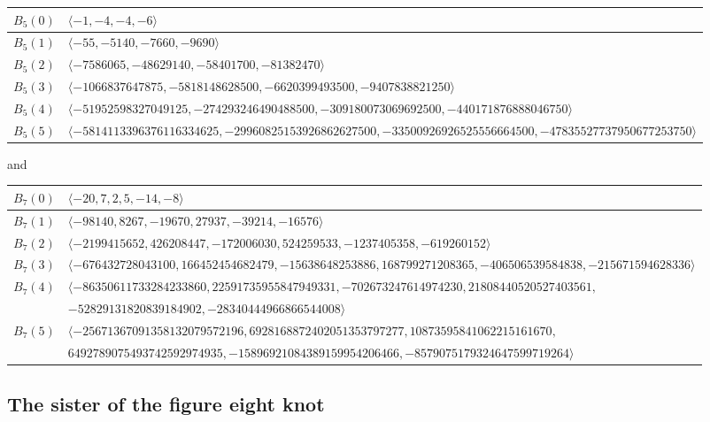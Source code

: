\documentclass[pdftex]{sigma}
\numberwithin{equation}{section}
\def\la{\langle}
\def\ra{\rangle}
\begin{document}
\begin{center}\renewcommand{\arraystretch}{1.2}\tiny
\begin{tabular}{|c|l|}
\hline
$B_5(0)$ & $\la -1, -4, -4, -6 \ra$ \\
\hline
$B_5(1)$ & $\la -55, -5140, -7660, -9690 \ra$ \\
\hline
$B_5(2)$ & $\la -7586065, -48629140, -58401700, -81382470 \ra$ \\
\hline
$B_5(3)$ & $\la -1066837647875, -5818148628500, -6620399493500, -9407838821250 \ra$ \\
\hline
$B_5(4)$ & $\la -51952598327049125, -274293246490488500, -309180073069692500, -440171876888046750 \ra$ \\
\hline
$B_5(5)$ & $\la -5814113396376116334625, -29960825153926862627500, -33500926926525556664500, -47835527737950677253750 \ra$
\\
\hline
\end{tabular}
\end{center}

\noindent
and

\begin{center}\renewcommand{\arraystretch}{1.2}\tiny
\begin{tabular}{|c|l|}
\hline
$B_7(0)$ & $\la -20, 7, 2, 5, -14, -8 \ra$ \\
\hline
$B_7(1)$ & $\la -98140, 8267, -19670, 27937, -39214, -16576 \ra$ \\
\hline
$B_7(2)$ & $\la -2199415652, 426208447, -172006030, 524259533, -1237405358, -619260152 \ra$ \\
\hline
$B_7(3)$ & $\la -676432728043100, 166452454682479, -15638648253886, 168799271208365, -406506539584838, -215671594628336
\ra$ \\
\hline
$B_7(4)$ & $\la -86350611733284233860, 22591735955847949331, -702673247614974230, 21808440520527403561, $ \\
& $ -52829131820839184902, -28340444966866544008 \ra$ \\
\hline
$B_7(5)$ & $\la -25671367091358132079572196, 6928168872402051353797277, 10873595841062215161670, $ \\
& $ 6492789075493742592974935, -15896921084389159954206466, -8579075179324647599719264 \ra$ \\
\hline
\end{tabular}
\end{center}


\subsection{The sister of the figure eight knot}
\label{sub.s41}
\end{document}
